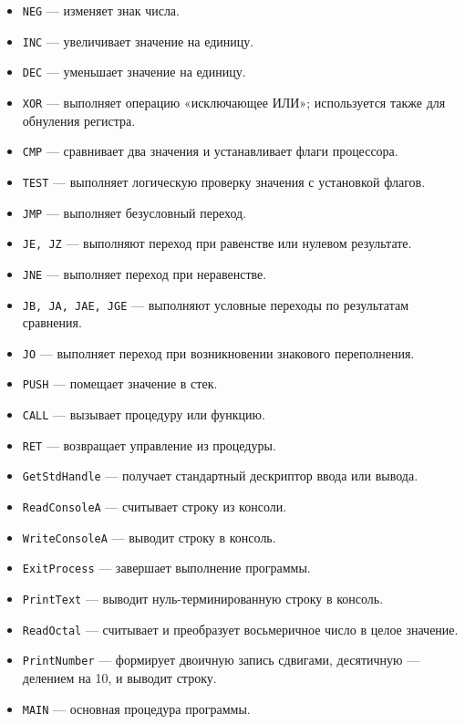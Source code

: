 \documentclass[12pt,a4paper]{article}
\begin{document}
\begin{itemize}
\item \texttt{NEG} --- изменяет знак числа.
\item \texttt{INC} --- увеличивает значение на единицу.
\item \texttt{DEC} --- уменьшает значение на единицу.
\item \texttt{XOR} --- выполняет операцию «исключающее ИЛИ»; используется также для обнуления регистра.
\item \texttt{CMP} --- сравнивает два значения и устанавливает флаги процессора.
\item \texttt{TEST} --- выполняет логическую проверку значения с установкой флагов.
\item \texttt{JMP} --- выполняет безусловный переход.
\item \texttt{JE, JZ} --- выполняют переход при равенстве или нулевом результате.
\item \texttt{JNE} --- выполняет переход при неравенстве.
\item \texttt{JB, JA, JAE, JGE} --- выполняют условные переходы по результатам сравнения.
\item \texttt{JO} --- выполняет переход при возникновении знакового переполнения.
\item \texttt{PUSH} --- помещает значение в стек.
\item \texttt{CALL} --- вызывает процедуру или функцию.
\item \texttt{RET} --- возвращает управление из процедуры.
\item \texttt{GetStdHandle} --- получает стандартный дескриптор ввода или вывода.
\item \texttt{ReadConsoleA} --- считывает строку из консоли.
\item \texttt{WriteConsoleA} --- выводит строку в консоль.
\item \texttt{ExitProcess} --- завершает выполнение программы.
\item \texttt{PrintText} --- выводит нуль-терминированную строку в консоль.
\item \texttt{ReadOctal} --- считывает и преобразует восьмеричное число в целое значение.
\item \texttt{PrintNumber} --- формирует двоичную запись сдвигами, десятичную --- делением на 10, и выводит строку.
\item \texttt{MAIN} --- основная процедура программы.
\end{itemize}
\end{document}

